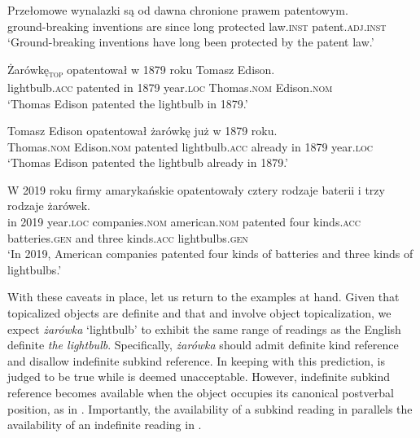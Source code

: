 \documentclass[output=paper,
colorlinks,
citecolor=brown,
newtxmath
]{langscibook}
\begin{document}
\ea \label{ex:lightbulb_kind}
\gll
Przełomowe wynalazki są od dawna chronione prawem patentowym.\\
ground-breaking inventions are since long protected law.\textsc{inst} patent.\textsc{adj.inst}\\
\glt `Ground-breaking inventions have long been protected by the patent law.'

\ea \label{ex:lightbulb_kind_1}
\gll
Żarówkę\textsubscript{\textsc{top}} opatentował w 1879 roku Tomasz Edison.\\
lightbulb.\textsc{acc} patented in 1879 year.\textsc{loc} Thomas.\textsc{nom} Edison.\textsc{nom}\\
\glt `Thomas Edison patented the lightbulb in 1879.'

\ex \label{ex:lightbulb_kind_2}
\gll
Tomasz Edison opatentował żarówkę już w 1879 roku.\\
Thomas.\textsc{nom} Edison.\textsc{nom} patented lightbulb.\textsc{acc} already in 1879 year.\textsc{loc}\\
\glt `Thomas Edison patented the lightbulb already in 1879.'
\z \z

\ea \label{ex:lightbulb_subkind}
\gll
W 2019 roku firmy amarykańskie opatentowały cztery rodzaje baterii i trzy rodzaje żarówek.\\
in 2019 year.\textsc{loc} companies.\textsc{nom} american.\textsc{nom} patented four kinds.\textsc{acc} batteries.\textsc{gen} and three kinds.\textsc{acc} lightbulbs.\textsc{gen}\\
\glt `In 2019, American companies patented four kinds of batteries and three kinds of lightbulbs.'


\z \z

\noindent
With these caveats in place, let us return to the examples at hand. Given that topicalized objects are definite and that  and  involve object topicalization, we expect \textit{żarówka} `lightbulb' to exhibit the same range of readings as the English definite \textit{the lightbulb}. Specifically, \textit{żarówka} should admit definite kind reference and disallow indefinite subkind reference. In keeping with this prediction,  is judged to be true while  is deemed unacceptable. However, indefinite subkind reference becomes available when the object occupies its canonical postverbal position, as in . Importantly, the availability of a subkind reading in  parallels the availability of an indefinite reading in .
\end{document}
